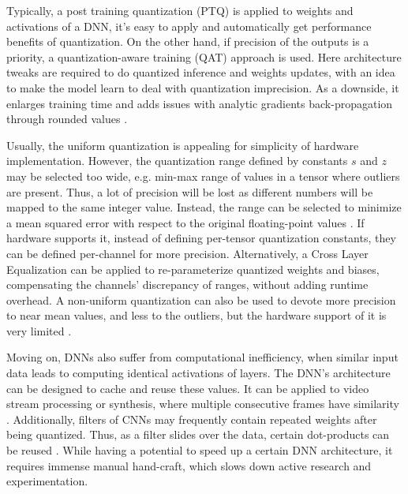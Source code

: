 Typically, a post training quantization (PTQ) is applied to weights and activations of a DNN, it's easy to apply and automatically get performance benefits of quantization. On the other hand, if precision of the outputs is a priority, a  quantization-aware training (QAT) \cite{quant:qat18} approach is used. Here architecture tweaks are required to do quantized inference and weights updates, with an idea to make the model learn to deal with quantization imprecision. As a downside, it enlarges training time and adds issues with analytic gradients back-propagation through rounded values \cite{quant:straight-through-estimator13}.

Usually, the uniform quantization is appealing for simplicity of hardware implementation. However, the quantization range defined by constants $s$ and $z$ may be selected too wide, e.g. min-max range of values in a tensor where outliers are present. Thus, a lot of precision will be lost as different numbers will be mapped to the same integer value. Instead, the range can be selected to minimize a mean squared error with respect to the original floating-point values \cite{quant:mse19, speed:quant-error-analysis15}. If hardware supports it, instead of defining per-tensor quantization constants, they can be defined per-channel for more precision. Alternatively, a Cross Layer Equalization \cite{quant:cle20} can be applied to re-parameterize quantized weights and biases, compensating the channels' discrepancy of ranges, without adding runtime overhead. A non-uniform quantization can also be used to devote more precision to near mean values, and less to the outliers, but the hardware support of it is very limited \cite{quant:non-uniform21}.

Moving on, DNNs also suffer from computational inefficiency, when similar input data leads to computing identical activations of layers. The DNN's architecture can be designed to cache and reuse these values. It can be applied to video stream processing or synthesis, where multiple consecutive frames have similarity \cite{aux:reusing19}. Additionally, filters of CNNs may frequently contain repeated weights after being quantized. Thus, as a filter slides over the data, certain dot-products can be reused \cite{dnn:reusing18}. While having a potential to speed up a certain DNN architecture, it requires immense manual hand-craft, which slows down active research and experimentation.

